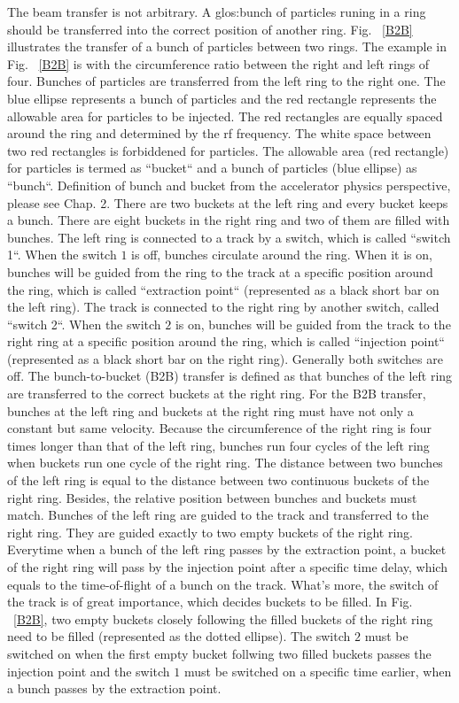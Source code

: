 The beam transfer is not arbitrary. A \gls{glos:bunch} of particles runing in a ring should be transferred into the correct position of another ring. Fig. ~\ref{B2B} illustrates the transfer of a bunch of particles between two rings. The example in Fig. ~\ref{B2B} is with the circumference ratio between the right and left rings of four. Bunches of particles are transferred from the left ring to the right one. The blue ellipse represents a bunch of particles and the red rectangle represents the allowable area for particles to be injected. The red rectangles are equally spaced around the ring and determined by the rf frequency. The white space between two red rectangles is forbiddened for particles. The allowable area (red rectangle) for particles is termed as ``bucket`` and a bunch of particles (blue ellipse) as ``bunch``. Definition of bunch and bucket from the accelerator physics perspective, please see Chap. 2. There are two buckets at the left ring and every bucket keeps a bunch. There are eight buckets in the right ring and two of them are filled with bunches. The left ring is connected to a track by a switch, which is called ``switch 1``. When the switch $1$ is off, bunches circulate around the ring. When it is on, bunches will be guided from the ring to the track at a specific position around the ring, which is called ``extraction point`` (represented as a black short bar on the left ring). The track is connected to the right ring by another switch, called ``switch 2``. When the switch $2$ is on, bunches will be guided from the track to the right ring at a specific position around the ring, which is called ``injection point`` (represented as a black short bar on the right ring). Generally both switches are off. The bunch-to-bucket (B2B) transfer is defined as that bunches of the left ring are transferred to the correct buckets at the right ring. For the B2B transfer, bunches at the left ring and buckets at the right ring must have not only a constant but same velocity. Because the circumference of the right ring is four times longer than that of the left ring, bunches run four cycles of the left ring when buckets run one cycle of the right ring. The distance between two bunches of the left ring is equal to the distance between two continuous buckets of the right ring. Besides, the relative position between bunches and buckets must match. Bunches of the left ring are guided to the track and transferred to the right ring. They are guided exactly to two empty buckets of the right ring. Everytime when a bunch of the left ring passes by the extraction point, a bucket of the right ring will pass by the injection point after a specific time delay, which equals to the time-of-flight of a bunch on the track. What's more, the switch of the track is of great importance, which decides buckets to be filled. In Fig. ~\ref{B2B}, two empty buckets closely following the filled buckets of the right ring need to be filled (represented as the dotted ellipse). The switch $2$ must be switched on when the first empty bucket follwing two filled buckets passes the injection point and the switch $1$ must be switched on a specific time earlier, when a bunch passes by the extraction point. 

